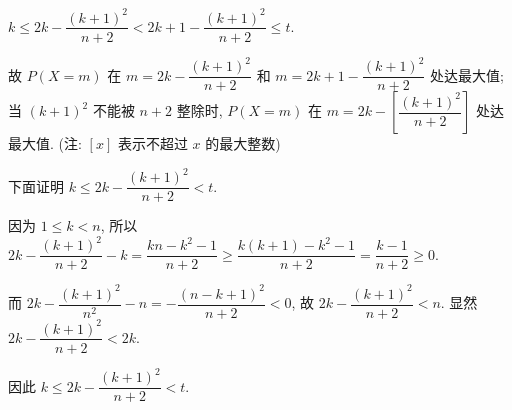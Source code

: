 \begin{solutions}
$k \le 2k - \dfrac{(k+1)^2}{n+2} < 2k+1 - \dfrac{(k+1)^2}{n+2} \le t$.

故 $P(X=m)$ 在 $m = 2k - \dfrac{(k+1)^2}{n+2}$ 和 $m = 2k+1 - \dfrac{(k+1)^2}{n+2}$ 处达最大值; 当 $(k+1)^2$ 不能被 $n+2$ 整除时, $P(X=m)$ 在 $m = 2k - \left[\dfrac{(k+1)^2}{n+2}\right]$ 处达最大值. (注: $[x]$ 表示不超过 $x$ 的最大整数)

下面证明 $k \le 2k - \dfrac{(k+1)^2}{n+2} < t$.

因为 $1 \le k < n$, 所以 $2k - \dfrac{(k+1)^2}{n+2} - k = \dfrac{kn-k^2-1}{n+2} \ge \dfrac{k(k+1)-k^2-1}{n+2} = \dfrac{k-1}{n+2} \ge 0$.

而 $2k - \dfrac{(k+1)^2}{n^2} - n = - \dfrac{(n-k+1)^2}{n+2} < 0$, 故 $2k - \dfrac{(k+1)^2}{n+2} < n$. 显然 $2k - \dfrac{(k+1)^2}{n+2} < 2k$.

因此 $k \le 2k - \dfrac{(k+1)^2}{n+2} < t$.
\end{solutions}

